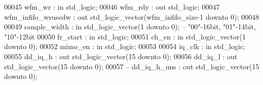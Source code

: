 \begin{DoxyCode}
00045         \textcolor{vhdlchar}{wfm_wr}                  \textcolor{vhdlchar}{:} \textcolor{keywordflow}{in} \textcolor{comment}{std\_logic};
00046         \textcolor{vhdlchar}{wfm_rdy}                 \textcolor{vhdlchar}{:} \textcolor{keywordflow}{out} \textcolor{comment}{std\_logic};
00047         \textcolor{vhdlchar}{wfm_infifo_wrusedw}  \textcolor{vhdlchar}{:} \textcolor{keywordflow}{out} \textcolor{comment}{std\_logic\_vector}\textcolor{vhdlchar}{(}\textcolor{vhdlchar}{wfm_infifo_size}\textcolor{vhdlchar}{-}\textcolor{vhdllogic}{}\textcolor{vhdllogic}{1} \textcolor{keywordflow}{downto} \textcolor{vhdllogic}{}\textcolor{vhdllogic}{0}\textcolor{vhdlchar}{)};
00048         
00049         \textcolor{vhdlchar}{sample_width}            \textcolor{vhdlchar}{:} \textcolor{keywordflow}{in} \textcolor{comment}{std\_logic\_vector}\textcolor{vhdlchar}{(}\textcolor{vhdllogic}{}\textcolor{vhdllogic}{1} \textcolor{keywordflow}{downto} \textcolor{vhdllogic}{}\textcolor{vhdllogic}{0}\textcolor{vhdlchar}{)};\textcolor{keyword}{ -- "00"-16bit, "01"-14bit, "10"-12bit}
00050         \textcolor{vhdlchar}{fr_start}                    \textcolor{vhdlchar}{:} \textcolor{keywordflow}{in} \textcolor{comment}{std\_logic};
00051         \textcolor{vhdlchar}{ch_en}                       \textcolor{vhdlchar}{:} \textcolor{keywordflow}{in} \textcolor{comment}{std\_logic\_vector}\textcolor{vhdlchar}{(}\textcolor{vhdllogic}{}\textcolor{vhdllogic}{1} \textcolor{keywordflow}{downto} \textcolor{vhdllogic}{}\textcolor{vhdllogic}{0}\textcolor{vhdlchar}{)};
00052       \textcolor{vhdlchar}{mimo_en}                   \textcolor{vhdlchar}{:} \textcolor{keywordflow}{in} \textcolor{comment}{std\_logic};
00053 
00054         \textcolor{vhdlchar}{iq_clk}                  \textcolor{vhdlchar}{:} \textcolor{keywordflow}{in} \textcolor{comment}{std\_logic};
00055         \textcolor{vhdlchar}{dd_iq_h}                 \textcolor{vhdlchar}{:} \textcolor{keywordflow}{out} \textcolor{comment}{std\_logic\_vector}\textcolor{vhdlchar}{(}\textcolor{vhdllogic}{}\textcolor{vhdllogic}{15} \textcolor{keywordflow}{downto} \textcolor{vhdllogic}{}\textcolor{vhdllogic}{0}\textcolor{vhdlchar}{)};
00056         \textcolor{vhdlchar}{dd_iq_l}                 \textcolor{vhdlchar}{:} \textcolor{keywordflow}{out} \textcolor{comment}{std\_logic\_vector}\textcolor{vhdlchar}{(}\textcolor{vhdllogic}{}\textcolor{vhdllogic}{15} \textcolor{keywordflow}{downto} \textcolor{vhdllogic}{}\textcolor{vhdllogic}{0}\textcolor{vhdlchar}{)};
00057 \textcolor{keyword}{--      dd\_iq\_h\_uns             : out std\_logic\_vector(15 downto 0);}

\end{DoxyCode}
